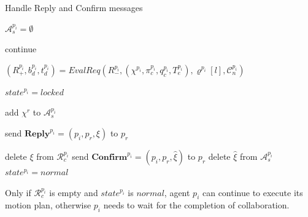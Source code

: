 \documentclass[journal]{IEEEtran}
\begin{document}
\begin{algorithm}
  \caption{Handle Reply and Confirm messages}
  $\mathcal{A}^{p_i}_s=\emptyset$

  {
    {
        {
            continue
        }
        {
            $(R^{p_i}_+,b^{p_i}_d,t^{p_i}_d)=EvalReq(R^{p_i}_-,(\chi^{p_i},\pi_c^{p_i},q_c^{p_i},T^{p_i}_e),\varrho^{p_i}[l],\mathcal{C}^{p_i}_n)$

            $state^{p_i}=locked$

            add $\chi^{r}$ to $\mathcal{A}^{p_i}_s$

            send $\textbf{Reply}^{p_i}=(p_i,p_r,\xi)$ to $p_r$
        }
    }
  }
  {
    {
        {
            delete $\xi$ from $\mathcal{R}^{p_i}_c$
        }
        {
            send $\textbf{Confirm}^{p_i}=(p_i,p_r,\hat{\xi})$ to $p_r$
        }
    }
  }
  {
    {
        {
            delete $\hat{\xi}$ from $\mathcal{A}^{p_i}_s$
        }
        {
            $state^{p_i}=normal$
        }
    }
  }
\end{algorithm}
Only if $\mathcal{R}^{p_i}_c$ is empty and $state^{p_i}$ is $normal$, agent $p_i$ can continue to execute its motion plan, otherwise $p_i$ needs to wait for the completion of collaboration.
\end{document}
